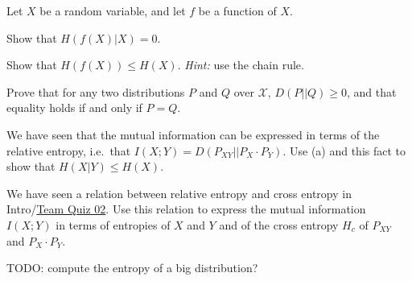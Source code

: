 \documentclass[a4paper,10pt,landscape,twocolumn]{scrartcl}
\begin{document}
\begin{exercise}
Let $X$ be a random variable, and let $f$ be a function of $X$.
	\begin{subex}[(1pt)]
	Show that $H(f(X) | X) = 0$.
	\end{subex}
	\begin{subex}[(2pt)]
	Show that $H(f(X)) \leq H(X)$. \emph{Hint:} use the chain rule.
	\end{subex}
\end{exercise}


\begin{exercise}
	\begin{subex}[(5pt)]
	Prove that for any two distributions $P$ and $Q$ over $\mathcal{X}$, $D(P||Q) \geq 0$, and that equality holds if and only if $P = Q$.
	\end{subex}
	\begin{subex}[(1pt)]
	We have seen that the mutual information can be expressed in
        terms of the relative entropy, i.e.\ that $I(X;Y) =
        D(P_{XY}||P_X \cdot P_Y)$. Use (a) and this fact to show that $H(X|Y) \leq H(X)$.
	\end{subex}
	\begin{subex}[(2pt)]
	We have seen a relation between relative entropy and cross
        entropy in Intro/\href{https://canvas.uva.nl/courses/2205/assignments/27821}{Team Quiz 02}. Use this relation to express
        the mutual information $I(X;Y)$ in terms of entropies of $X$
        and $Y$ and of the cross entropy $H_c$ of $P_{XY}$ and $P_X
        \cdot P_Y$.
	\end{subex}
\end{exercise}



\begin{exercise}[Programming... (5pt)]
TODO: compute the entropy of a big distribution?
\end{exercise}
\end{document}
